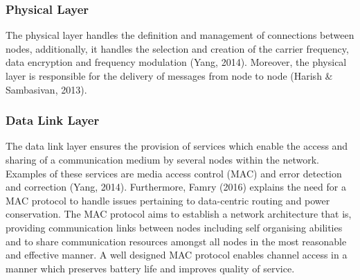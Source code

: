 \documentclass[a4paper]{article}
\begin{document}
\subsubsection*{ Physical Layer}
The physical layer handles the definition and management of connections between nodes, additionally, it handles the selection and creation of the carrier frequency, data encryption and frequency modulation (Yang, 2014). Moreover, the physical layer is responsible for the delivery of messages from node to node (Harish \& Sambasivan, 2013).

\subsubsection*{Data Link Layer}
The data link layer ensures the provision of services which enable the access and sharing of a communication medium by several nodes within the network. Examples of these services are media access control (MAC) and error detection and correction (Yang, 2014).
Furthermore, Famry (2016) explains the need for a MAC protocol to handle issues pertaining to data-centric routing and power conservation. The MAC protocol aims to establish a network architecture that is, providing communication links between nodes including self organising abilities and to share communication resources amongst all nodes in the most reasonable and effective manner. A well designed MAC protocol enables channel access in a manner which preserves battery life and improves quality of service.  
\end{document}
